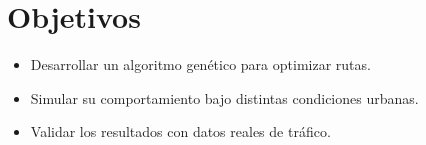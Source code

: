 \section*{Objetivos}
\begin{itemize}
  \item Desarrollar un algoritmo genético para optimizar rutas.
  \item Simular su comportamiento bajo distintas condiciones urbanas.
  \item Validar los resultados con datos reales de tráfico.
\end{itemize}
